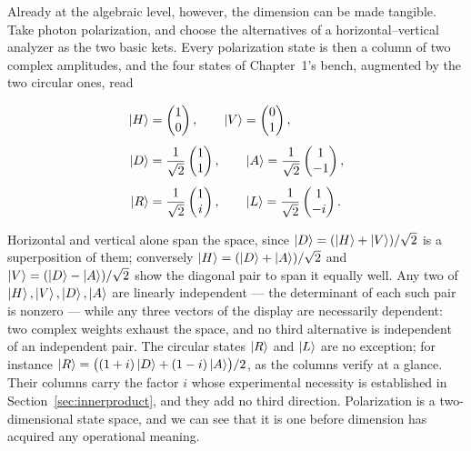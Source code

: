 Already at the algebraic level, however, the dimension can be made tangible. Take photon polarization, and choose the alternatives of a horizontal--vertical analyzer as the two basic kets. Every polarization state is then a column of two complex amplitudes, and the four states of Chapter~1's bench, augmented by the two circular ones, read
\begin{linenomath}
\begin{equation}
\begin{aligned}
    \ket{H}&=
    \begin{pmatrix}1\\0\end{pmatrix},\qquad
    \ket{V}=
    \begin{pmatrix}0\\1\end{pmatrix},\\[4pt]
    \ket{D}&=\frac{1}{\sqrt{2}}
    \begin{pmatrix}1\\1\end{pmatrix},\qquad
    \ket{A}=\frac{1}{\sqrt{2}}
    \begin{pmatrix}1\\-1\end{pmatrix},\\[4pt]
    \ket{R}&=\frac{1}{\sqrt{2}}
    \begin{pmatrix}1\\ i\end{pmatrix},\qquad
    \ket{L}=\frac{1}{\sqrt{2}}
    \begin{pmatrix}1\\-i\end{pmatrix}.
\end{aligned}
\end{equation}
\end{linenomath}
Horizontal and vertical alone span the space, since $\ket{D}=(\ket{H}+\ket{V})/\sqrt{2}$ is a superposition of them; conversely $\ket{H}=(\ket{D}+\ket{A})/\sqrt{2}$ and $\ket{V}=(\ket{D}-\ket{A})/\sqrt{2}$ show the diagonal pair to span it equally well. Any two of $\ket{H},\ket{V},\ket{D},\ket{A}$ are linearly independent --- the determinant of each such pair is nonzero --- while any three vectors of the display are necessarily dependent: two complex weights exhaust the space, and no third alternative is independent of an independent pair. The circular states $\ket{R}$ and $\ket{L}$ are no exception; for instance $\ket{R}=\bigl((1+i)\ket{D}+(1-i)\ket{A}\bigr)/2$, as the columns verify at a glance. Their columns carry the factor $i$ whose experimental necessity is established in Section~\ref{sec:innerproduct}, and they add no third direction. Polarization is a two-dimensional state space, and we can see that it is one before dimension has acquired any operational meaning.

